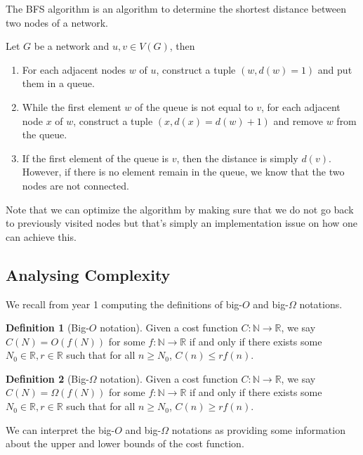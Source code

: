 \documentclass[
]{article}
\theoremstyle{definition}
\theoremstyle{definition}
\newtheorem{definition}{Definition}[section]
\begin{document}
The BFS algorithm is an algorithm to determine the shortest distance
between two nodes of a network.

Let \(G\) be a network and \(u, v \in V(G)\), then

\begin{enumerate}
  \item For each adjacent nodes \(w\) of \(u\), construct a tuple 
    \((w, d(w) = 1)\) and put them in a queue.
  \item While the first element \(w\) of the queue is not equal to \(v\), 
    for each adjacent node \(x\) of \(w\), construct a tuple 
    \((x, d(x) = d(w) + 1)\) and remove \(w\) from the queue.
  \item If the first element of the queue is \(v\), then the distance is simply 
    \(d(v)\). However, if there is no element remain in the queue, we know that 
    the two nodes are not connected.
\end{enumerate}

Note that we can optimize the algorithm by making sure that we do not go
back to previously visited nodes but that's simply an implementation
issue on how one can achieve this.

\hypertarget{analysing-complexity}{%
\subsection{Analysing Complexity}\label{analysing-complexity}}

We recall from year 1 computing the definitions of big-\(O\) and
big-\(\Omega\) notations.

\begin{definition}[Big-\(O\) notation]
  Given a cost function \(C : \mathbb{N} \to \mathbb{R}\), we say 
  \(C(N) = O(f(N))\) for some \(f : \mathbb{N} \to \mathbb{R}\) if and only 
  if there exists some \(N_0 \in \mathbb{R}, r \in \mathbb{R}\) such that 
  for all \(n \ge N_0\), \(C(n) \le rf(n)\).
\end{definition}

\begin{definition}[Big-\(\Omega\) notation]
  Given a cost function \(C : \mathbb{N} \to \mathbb{R}\), we say 
  \(C(N) = \Omega(f(N))\) for some \(f : \mathbb{N} \to \mathbb{R}\) if and only 
  if there exists some \(N_0 \in \mathbb{R}, r \in \mathbb{R}\) such that 
  for all \(n \ge N_0\), \(C(n) \ge rf(n)\).
\end{definition}

We can interpret the big-\(O\) and big-\(\Omega\) notations as providing
some information about the upper and lower bounds of the cost function.
\end{document}
